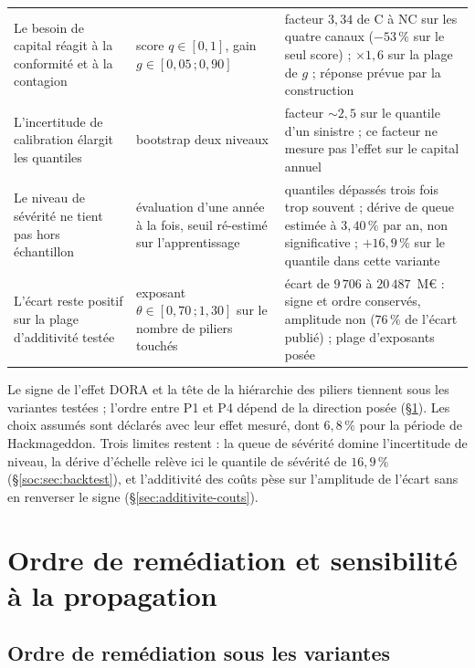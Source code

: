 {\begin{longtable}{@{}p{4.5cm} p{4.6cm} p{6.5cm}@{}}
Le besoin de capital réagit à la conformité et à la contagion &
score $q\in[0,1]$, gain $g\in[0{,}05\,;0{,}90]$ &
facteur $3{,}34$ de C à NC sur les quatre canaux ($-53\,\%$ sur le seul score) ; $\times1{,}6$ sur la plage de $g$ ; réponse prévue par la construction \\
L'incertitude de calibration élargit les quantiles &
bootstrap deux niveaux &
facteur ${\sim}2{,}5$ sur le quantile d'un sinistre ; ce facteur ne mesure pas l'effet sur le capital annuel \\
Le niveau de sévérité ne tient pas hors échantillon &
évaluation d'une année à la fois, seuil ré-estimé sur l'apprentissage &
quantiles dépassés trois fois trop souvent ; dérive de queue estimée à $3{,}40\,\%$ par an, non significative ; $+16{,}9\,\%$ sur le quantile dans cette variante \\
L'écart reste positif sur la plage d'additivité testée &
exposant $\theta\in[0{,}70\,;1{,}30]$ sur le nombre de piliers touchés &
écart de $9\,706$ à $20\,487$~M\euro{} : signe et ordre conservés, amplitude non ($76\,\%$ de l'écart publié) ; plage d'exposants posée \\
\end{longtable}
}

\vspace{4pt}
\noindent Le signe de l'effet DORA et la tête de la hiérarchie des piliers tiennent sous les variantes
testées ; l'ordre entre P1 et P4 dépend de la direction posée (\S\ref{sec:res-robustesse}). Les
choix assumés sont déclarés avec leur effet mesuré, dont $6{,}8\,\%$ pour la période de
Hackmageddon. Trois limites restent : la queue de sévérité domine l'incertitude de niveau, la dérive
d'échelle relève ici le quantile de sévérité de $16{,}9\,\%$ (\S\ref{soc:sec:backtest}), et
l'additivité des coûts pèse sur l'amplitude de l'écart sans en renverser le signe
(\S\ref{sec:additivite-couts}).


\section{Ordre de remédiation et sensibilité à la propagation}
\label{sec:res-robustesse}

\subsection{Ordre de remédiation sous les variantes}

